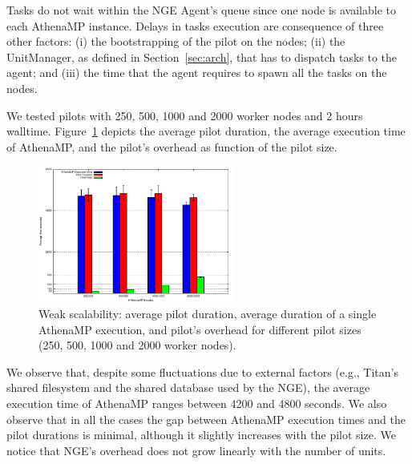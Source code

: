 Tasks do not %
wait within the NGE Agent's queue %
since %
one node %
is available to each AthenaMP instance. %
Delays in tasks execution are consequence of %
three other factors: (i) the bootstrapping of the pilot on the nodes; (ii) the
UnitManager, as defined in Section~\ref{sec:arch}, that has to dispatch tasks to
the agent; and (iii) the time that the agent requires to spawn all the tasks on
the nodes.

We tested %
pilots %
with 250, 500, 1000 and 2000 worker nodes and
2 hours walltime. Figure~\ref{fig:weakScal1a} depicts the average pilot
duration, the average execution time of AthenaMP, and the pilot's overhead as
function of the pilot size.

\begin{figure}[!htb]
        \includegraphics[height=4.5cm,width=\columnwidth]{./figures/NGE/weak1.pdf}
    \caption{Weak scalability: average pilot duration, average duration of a
    single AthenaMP execution, and pilot's overhead for different pilot sizes
    (250, 500, 1000 and 2000 worker nodes). }
\label{fig:weakScal1a}
\end{figure}

We %
observe that, despite some fluctuations due to external factors
(e.g., Titan's shared filesystem and the shared database used by the NGE), the
average execution time of AthenaMP %
ranges between 4200 and 4800 seconds. %
We %
also observe that in all the cases the gap between AthenaMP execution times and
the pilot durations is minimal, although it slightly increases with the pilot
size. %
We %
notice that NGE's overhead does not grow linearly with the number of units.



